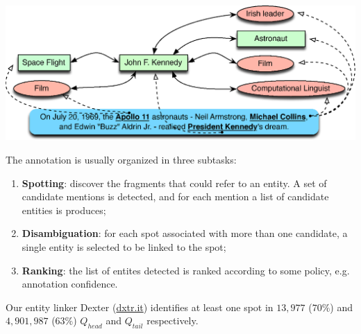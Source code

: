 \documentclass[a0,portrait,final]{a0poster}
\newcommand{\tail}[1]{$Q_{tail}${}}
\newcommand{\head}[1]{$Q_{head}${}}
\newcommand{\pbox}[3]{
	\begin{center}
	\psshadowbox[linewidth=2mm,framearc=0.1,framesep=1em,shadowsize=4mm,shadowcolor=lightgray,linecolor=#2]{
		\begin{minipage}[t][][t]{#1}{
			#3 %
		}\end{minipage}
	}
	\end{center}
}
\newlength\ptitlespace
\newcommand{\ptitle}[1]{
	\vspace{\ptitlespace}
	\pbox{0.92\columnwidth}{arancioneisti}{
		\begin{center}
		\textsc{\LARGE\bluisti{#1}} %
		\end{center}
	}
	\vspace{0.5\ptitlespace}
}
\begin{document}
\begin{multicols}{2}
\vspace{5mm}
\begin{center}
\includegraphics[width=0.92\columnwidth]{img/annotation-example.eps}
\end{center}

The annotation is usually organized in three subtasks:
\begin{enumerate}
	\item \textbf{Spotting}: discover the fragments that could refer to an entity. A set of candidate mentions is detected, and for each mention a list of candidate entities is produces;
	\item \textbf{Disambiguation}: for each spot associated with more than one candidate, a single entity is selected to be linked to the spot;
	\item \textbf{Ranking}: the list of entites detected is ranked according to some policy, e.g. annotation confidence. 
\end{enumerate}

Our entity linker Dexter (\url{dxtr.it}) identifies 
at least one spot in $13,977$ ($70\%$) and $4,901,987$ ($63\%$) \head{} and \tail{} 
respectively.

\ptitle{Analysis}



\end{multicols}
\end{document}
